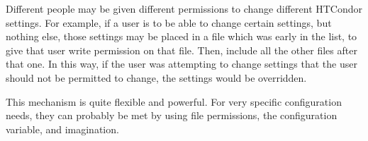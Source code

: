 Different people may be given different permissions to change different
HTCondor settings.  For example, if a user is to be able to
change certain settings, but nothing else, those
settings may be placed in a file which was early
in the  list,
to give that user write permission on that file.
Then, include all the other files after that one.
In this way, if the user was attempting to
change settings that the user should not be permitted to change,
the settings would be overridden.  

This mechanism is quite flexible and powerful.  For
very specific configuration needs, they can probably be met by
using file permissions, the  configuration
variable, and imagination.

